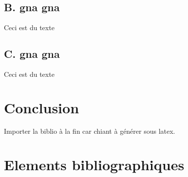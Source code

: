 \documentclass[12pt]{article}
\begin{document}
		\subsection{ B. gna gna}
		
		Ceci est du texte
		
		\subsection{ C. gna gna}
		
		Ceci est du texte
		
		\clearpage

	\section{Conclusion}
	
		Importer la biblio à la fin car chiant à générer sous latex.
		
		\clearpage

	\section{Elements bibliographiques}
	
\end{document}
